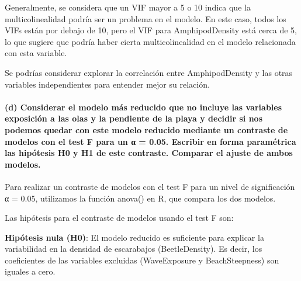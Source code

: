 \documentclass[
]{article}
\begin{document}
Generalmente, se considera que un VIF mayor a 5 o 10 indica que la
multicolinealidad podría ser un problema en el modelo. En este caso,
todos los VIFs están por debajo de 10, pero el VIF para AmphipodDensity
está cerca de 5, lo que sugiere que podría haber cierta
multicolinealidad en el modelo relacionada con esta variable.

Se podrías considerar explorar la correlación entre AmphipodDensity y
las otras variables independientes para entender mejor su relación.

\hypertarget{d-considerar-el-modelo-muxe1s-reducido-que-no-incluye-las-variables-exposiciuxf3n-a-las-olas-y-la-pendiente-de-la-playa-y-decidir-si-nos-podemos-quedar-con-este-modelo-reducido-mediante-un-contraste-de-modelos-con-el-test-f-para-un-ux3b1-0.05.-escribir-en-forma-paramuxe9trica-las-hipuxf3tesis-h0-y-h1-de-este-contraste.-comparar-el-ajuste-de-ambos-modelos.}{%
\paragraph{\texorpdfstring{\textbf{(d) Considerar el modelo más reducido
que no incluye las variables exposición a las olas y la pendiente de la
playa y decidir si nos podemos quedar con este modelo reducido mediante
un contraste de modelos con el test F para un α = 0.05. Escribir en
forma paramétrica las hipótesis H0 y H1 de este contraste. Comparar el
ajuste de ambos
modelos.}}{(d) Considerar el modelo más reducido que no incluye las variables exposición a las olas y la pendiente de la playa y decidir si nos podemos quedar con este modelo reducido mediante un contraste de modelos con el test F para un α = 0.05. Escribir en forma paramétrica las hipótesis H0 y H1 de este contraste. Comparar el ajuste de ambos modelos.}}\label{d-considerar-el-modelo-muxe1s-reducido-que-no-incluye-las-variables-exposiciuxf3n-a-las-olas-y-la-pendiente-de-la-playa-y-decidir-si-nos-podemos-quedar-con-este-modelo-reducido-mediante-un-contraste-de-modelos-con-el-test-f-para-un-ux3b1-0.05.-escribir-en-forma-paramuxe9trica-las-hipuxf3tesis-h0-y-h1-de-este-contraste.-comparar-el-ajuste-de-ambos-modelos.}}

Para realizar un contraste de modelos con el test F para un nivel de
significación α = 0.05, utilizamos la función anova() en R, que compara
los dos modelos.

Las hipótesis para el contraste de modelos usando el test F son:

\textbf{Hipótesis nula (H0)}: El modelo reducido es suficiente para
explicar la variabilidad en la densidad de escarabajos (BeetleDensity).
Es decir, los coeficientes de las variables excluidas (WaveExposure y
BeachSteepness) son iguales a cero.
\end{document}
